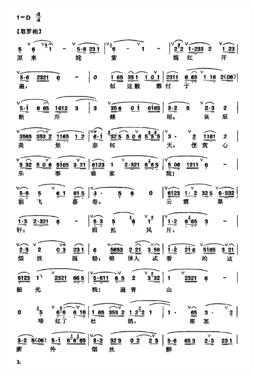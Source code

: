 \documentclass[cn,pad,twocol]{elegantbook}
\begin{document}
\paragraph*{\includegraphics[width=0.95\textwidth]{mudanting/2020-牡丹亭-游园惊梦3}}
\end{document}
